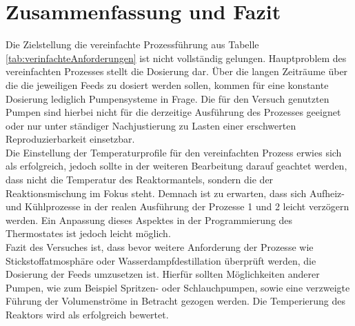 \section{Zusammenfassung und Fazit}
\label{sec:zusammenfassung}
Die Zielstellung die vereinfachte Prozessführung aus Tabelle \ref{tab:verinfachteAnforderungen} ist nicht vollständig gelungen. Hauptproblem des vereinfachten Prozesses stellt die Dosierung dar. Über die langen Zeiträume über die die jeweiligen Feeds zu dosiert werden sollen, kommen für eine konstante Dosierung lediglich Pumpensysteme in Frage. Die für den Versuch genutzten Pumpen sind hierbei nicht für die derzeitige Ausführung des Prozesses geeignet oder nur unter ständiger Nachjustierung zu Lasten einer erschwerten Reproduzierbarkeit einsetzbar.\\
Die Einstellung der Temperaturprofile für den vereinfachten Prozess erwies sich als erfolgreich, jedoch sollte in der weiteren Bearbeitung darauf geachtet werden, dass nicht die Temperatur des Reaktormantels, sondern die der Reaktionsmischung im Fokus steht. Demnach ist zu erwarten, dass sich Aufheiz- und Kühlprozesse in der realen Ausführung der Prozesse 1 und 2 leicht verzögern werden. Ein Anpassung dieses Aspektes in der Programmierung des Thermostates ist jedoch leicht möglich.\\

Fazit des Versuches ist, dass bevor weitere Anforderung der Prozesse wie Stickstoffatmosphäre oder Wasserdampfdestillation überprüft werden, die Dosierung der Feeds umzusetzen ist. Hierfür sollten Möglichkeiten anderer Pumpen, wie zum Beispiel Spritzen- oder Schlauchpumpen, sowie eine verzweigte Führung der Volumenströme in Betracht gezogen werden. Die Temperierung des Reaktors wird als erfolgreich bewertet.
